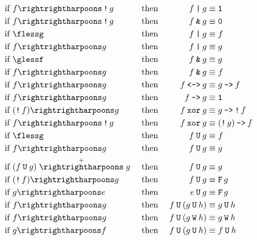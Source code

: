 \documentclass[a4paper,twoside,10pt,DIV=12]{scrreprt}
\DeclareMathOperator{\F}{\texttt{F}}
\newcommand{\U}{\mathbin{\texttt{U}}}
\newcommand{\W}{\mathbin{\texttt{W}}}
\DeclareMathOperator{\NOT}{\texttt{!}}
\newcommand{\XOR}{\mathbin{\texttt{xor}}}
\newcommand{\IMPLIES}{\mathbin{\texttt{->}}}
\newcommand{\EQUIV}{\mathbin{\texttt{<->}}}
\newcommand{\OR}{\mathbin{\texttt{|}}}
\newcommand{\AND}{\mathbin{\texttt{\&}}}
\newcommand{\0}{\texttt{0}}
\newcommand{\1}{\texttt{1}}
\def\simp{\rightrightharpoons}
\def\Simp{\stackrel{+}{\simp}}
\begin{document}
\begingroup
\allowdisplaybreaks
\begin{alignat*}{3}
\text{if~} & f\simp \NOT g   &  & \text{~then~} & f\OR g              & \equiv \1                 \\
\text{if~} & f\simp \NOT g   &  & \text{~then~} & f\AND g             & \equiv \0                 \\
\text{if~} & \flessg         &  & \text{~then~} & f\OR g              & \equiv f                  \\
\text{if~} & f\simp g        &  & \text{~then~} & f\OR g              & \equiv g                  \\
\text{if~} & \glessf         &  & \text{~then~} & f\AND g             & \equiv g                  \\
\text{if~} & f\simp g        &  & \text{~then~} & f\AND g             & \equiv f                  \\
\text{if~} & f\simp g        &  & \text{~then~} & f\EQUIV g           & \equiv g\IMPLIES f        \\
\text{if~} & f\simp g        &  & \text{~then~} & f\IMPLIES g         & \equiv \1                 \\
\text{if~} & (\NOT f)\simp g &  & \text{~then~} & f\XOR g             & \equiv g\IMPLIES \NOT f   \\
\text{if~} & f\simp\NOT g    &  & \text{~then~} & f\XOR g             & \equiv (\NOT g)\IMPLIES f \\
\text{if~} & \flessg         &  & \text{~then~} & f\U g               & \equiv f                  \\
\text{if~} & f\simp g        &  & \text{~then~} & f\U g               & \equiv g                  \\
\text{if~} & (f\U g)\Simp g  &  & \text{~then~} & f\U g               & \equiv g                  \\
\text{if~} & (\NOT f)\simp g &  & \text{~then~} & f\U g               & \equiv \F g               \\
\text{if~} & g\simp e        &  & \text{~then~} & e\U g               & \equiv \F g               \\
\text{if~} & f\simp g        &  & \text{~then~} & f\U (g \U h)        & \equiv g \U h             \\
\text{if~} & f\simp g        &  & \text{~then~} & f\U (g \W h)        & \equiv g \W h             \\
\text{if~} & g\simp f        &  & \text{~then~} & f\U (g \U h)        & \equiv f \U h             \\

\end{alignat*}
\end{document}
